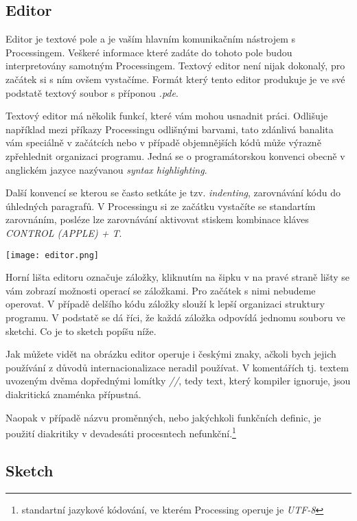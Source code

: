 \documentclass[11pt]{article} %
\begin{document}
\subsection{Editor}

Editor je textové pole a je vaším hlavním komunikačním nástrojem s Processingem. Veškeré informace které zadáte do tohoto pole budou interpretovány samotným Processingem. Textový editor není nijak dokonalý, pro začátek si s ním ovšem vystačíme. Formát který tento editor produkuje je ve své podstatě textový soubor s příponou {\em *.pde}.

Textový editor má několik funkcí, které vám mohou usnadnit práci. Odlišuje například mezi příkazy Processingu odlišnými barvami, tato zdánlivá banalita vám speciálně v začátcích nebo v případě objemnějších kódů může výrazně zpřehlednit organizaci programu. Jedná se o programátorskou konvenci obecně v anglickém jazyce nazývanou {\em syntax highlighting}.

Další konvencí se kterou se často setkáte je tzv. {\em indenting}, zarovnávání kódu do úhledných paragrafů. V Processingu si ze začátku vystačíte se standartím zarovnáním, posléze lze zarovnávání aktivovat stiskem kombinace kláves {\em CONTROL (APPLE) + T}.\\


\begin{center}
\texttt{[image: editor.png]}
\end{center}

Horní lišta editoru označuje záložky, kliknutím na šipku v na pravé straně lišty se vám zobrazí možnosti operací se záložkami. Pro začátek s nimi nebudeme operovat. V případě delšího kódu záložky slouží k lepší organizaci struktury programu. V podstatě se dá říci, že každá záložka odpovídá jednomu souboru ve sketchi. Co je to sketch popíšu níže.

Jak můžete vidět na obrázku editor operuje i českými znaky, ačkoli bych jejich používání z důvodů internacionalizace neradil používat. V komentářích tj. textem uvozeným dvěma dopřednými lomítky {\em //}, tedy text, který kompiler ignoruje, jsou diakritická znaménka přípustná.

Naopak v případě názvu proměnných, nebo jakýchkoli funkčních definic, je použití diakritiky v devadesáti procesntech nefunkční.\footnote{standartní jazykové kódování, ve kterém Processing operuje je {\em UTF-8}}

\subsection{Sketch}
\end{document}

